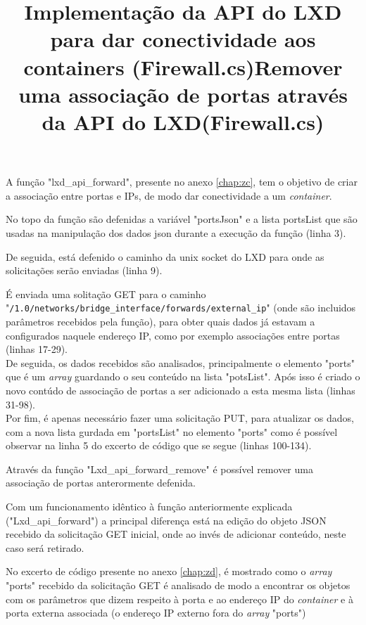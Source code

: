 \title*{\textbf{Implementação da API do LXD para dar conectividade aos containers (Firewall.cs)}}


A função "lxd\_api\_forward", presente no anexo \ref{chap:zc}, tem o objetivo de criar a associação entre portas e
IPs, de modo dar conectividade a um \textit{container}.

No topo da função são defenidas a variável "portsJson" e a lista portsList que são usadas
na manipulação dos dados json durante a execução da função (linha 3).

De seguida, está defenido o caminho da unix socket do LXD para onde as solicitações
serão enviadas (linha 9).



É enviada uma solitação GET para o caminho \\
"\texttt{/1.0/networks/{bridge\_interface}/forwards/{external\_ip}}"
(onde são incluidos parâmetros recebidos pela função), para obter quais dados já estavam 
a configurados naquele endereço IP, como por exemplo associações entre portas (linhas 17-29). \\

De seguida, os dados recebidos são analisados, principalmente o elemento "ports"
que é um \textit{array} guardando o seu conteúdo na lista "potsList". Após isso
é criado o novo contúdo de associação de portas a ser adicionado a esta mesma lista (linhas 31-98).\\





Por fim, é apenas necessário fazer uma solicitação PUT, para atualizar os dados, com a nova 
lista gurdada em "portsList" no elemento "ports" como é possível observar
na linha 5 do excerto de código que se segue (linhas 100-134).\\




\title*{\textbf{Remover uma associação de portas através da API do LXD(Firewall.cs)}}

Através da função "Lxd\_api\_forward\_remove" é possível remover uma associação de portas
anterormente defenida.


Com um funcionamento idêntico à função anteriormente explicada ("Lxd\_api\_forward")
a principal diferença está na edição do objeto JSON recebido da solicitação GET inicial,
onde ao invés de adicionar conteúdo, neste caso será retirado. 


 

No excerto de código presente no anexo \ref{chap:zd}, é mostrado como o \textit{array} "ports" recebido da solicitação GET é analisado
de modo a encontrar os objetos com os parâmetros que dizem respeito à porta e ao endereço IP do 
\textit{container} e à porta externa associada (o endereço IP externo fora 
do \textit{array} "ports")

